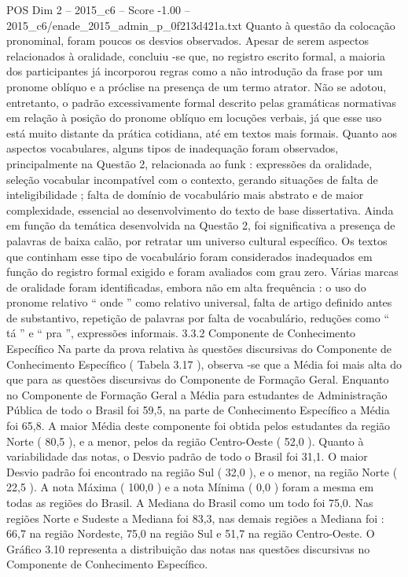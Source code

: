 \begin{textsample}{POS Dim 2 – 2015\_c6 – Score -1.00 – 2015\_c6/enade\_2015\_admin\_p\_0f213d421a.txt}
Quanto à questão da colocação pronominal, foram poucos os desvios observados.
Apesar de serem aspectos relacionados à oralidade, concluiu -se que, no registro escrito formal, a maioria dos participantes já incorporou regras como a não introdução da frase por um pronome oblíquo e a próclise na presença de um termo atrator.
Não se adotou, entretanto, o padrão excessivamente formal descrito pelas gramáticas normativas em relação à posição do pronome oblíquo em locuções verbais, já que esse uso está muito distante da prática cotidiana, até em textos mais formais.
Quanto aos aspectos vocabulares, alguns tipos de inadequação foram observados, principalmente na Questão 2, relacionada ao funk : expressões da oralidade, seleção vocabular incompatível com o contexto, gerando situações de falta de inteligibilidade ; falta de domínio de vocabulário mais abstrato e de maior complexidade, essencial ao desenvolvimento do texto de base dissertativa.
Ainda em função da temática desenvolvida na Questão 2, foi significativa a presença de palavras de baixa calão, por retratar um universo cultural específico.
Os textos que continham esse tipo de vocabulário foram considerados inadequados em função do registro formal exigido e foram avaliados com grau zero.
Várias marcas de oralidade foram identificadas, embora não em alta frequência : o uso do pronome relativo “ onde ” como relativo universal, falta de artigo definido antes de substantivo, repetição de palavras por falta de vocabulário, reduções como “ tá ” e “ pra ”, expressões informais. 3.3.2 Componente de Conhecimento Específico Na parte da prova relativa às questões discursivas do Componente de Conhecimento Específico ( Tabela 3.17 ), observa -se que a Média foi mais alta do que para as questões discursivas do Componente de Formação Geral.
Enquanto no Componente de Formação Geral a Média para estudantes de Administração Pública de todo o Brasil foi 59,5, na parte de Conhecimento Específico a Média foi 65,8.
A maior Média deste componente foi obtida pelos estudantes da região Norte ( 80,5 ), e a menor, pelos da região Centro-Oeste ( 52,0 ).
Quanto à variabilidade das notas, o Desvio padrão de todo o Brasil foi 31,1.
O maior Desvio padrão foi encontrado na região Sul ( 32,0 ), e o menor, na região Norte ( 22,5 ).
A nota Máxima ( 100,0 ) e a nota Mínima ( 0,0 ) foram a mesma em todas as regiões do Brasil.
A Mediana do Brasil como um todo foi 75,0.
Nas regiões Norte e Sudeste a Mediana foi 83,3, nas demais regiões a Mediana foi : 66,7 na região Nordeste, 75,0 na região Sul e 51,7 na região Centro-Oeste.
O Gráfico 3.10 representa a distribuição das notas nas questões discursivas no Componente de Conhecimento Específico.

\end{textsample}
